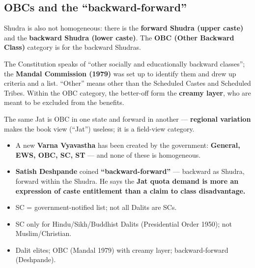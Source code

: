 \subsection{OBCs and the ``backward-forward''}

Shudra is also not homogeneous: there is the \textbf{forward Shudra (upper caste)} and the \textbf{backward Shudra (lower caste)}. The \textbf{OBC (Other Backward Class)} category is for the backward Shudras.

\begin{GovtPolicy}
The Constitution speaks of ``other socially and educationally backward classes''; the \textbf{Mandal Commission (1979)} was set up to identify them and drew up criteria and a list. ``Other'' means other than the Scheduled Castes and Scheduled Tribes. Within the OBC category, the better-off form the \textbf{creamy layer}, who are meant to be excluded from the benefits.
\end{GovtPolicy}

\begin{ExampleBox}
The same Jat is OBC in one state and forward in another --- \textbf{regional variation} makes the book view (``Jat'') useless; it is a field-view category.
\end{ExampleBox}

\begin{CriticalPoint}
\begin{itemize}
\item A new \textbf{Varna Vyavastha} has been created by the government: \textbf{General, EWS, OBC, SC, ST} --- and none of these is homogeneous.
\item \textbf{Satish Deshpande} coined \textbf{``backward-forward''} --- backward as Shudra, forward within the Shudra. He says the \textbf{Jat quota demand is more an expression of caste entitlement than a claim to class disadvantage.}
\end{itemize}
\end{CriticalPoint}

\begin{QuickRevision}
\begin{itemize}
\item SC = government-notified list; not all Dalits are SCs.
\item SC only for Hindu/Sikh/Buddhist Dalits (Presidential Order 1950); not Muslim/Christian.
\item Dalit elites; OBC (Mandal 1979) with creamy layer; backward-forward (Deshpande).
\end{itemize}
\end{QuickRevision}

